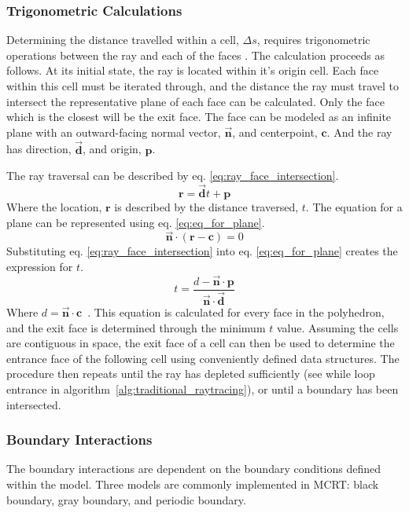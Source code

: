 \subsubsection{Trigonometric Calculations}
Determining the distance travelled within a cell, $\Delta{s}$, requires trigonometric operations between the ray and each of the faces \cite{Zeeb2001AnGeometries}.
The calculation proceeds as follows. At its initial state, the ray is located within it's origin cell. Each face within this cell must be iterated through, and the distance the ray must travel to intersect the representative plane of each face can be calculated. 
Only the face which is the closest will be the exit face. 
The face can be modeled as an infinite plane with an outward-facing normal vector, $\Vec{\textbf{n}}$, and centerpoint, $\textbf{c}$.
And the ray has direction, $\Vec{\textbf{d}}$, and origin, $\textbf{p}$. 


The ray traversal can be described by eq. \ref{eq:ray_face_intersection}.
\begin{equation}
    \textbf{r} = \Vec{\textbf{d}}t + \textbf{p}
    \label{eq:ray_face_intersection}
\end{equation}
Where the location, $\textbf{r}$ is described by the distance traversed, $t$.
The equation for a plane can be represented using eq. \ref{eq:eq_for_plane}.
\begin{equation}
    \Vec{\textbf{n}} \cdot (\textbf{r} - \textbf{c}) = 0
    \label{eq:eq_for_plane}
\end{equation}
Substituting eq. \ref{eq:ray_face_intersection} into eq. \ref{eq:eq_for_plane} creates the expression for $t$.
\begin{equation}
    t=\frac{d-\Vec{\textbf{n}}\cdot\textbf{p}}{\Vec{\textbf{n}}\cdot\Vec{\textbf{d}}}
    \label{eq:eq_for_plane}
\end{equation}
Where $d=\Vec{\textbf{n}}\cdot\textbf{c}$~\cite{Kay1986RayScenes}. This equation is calculated for every face in the polyhedron, and the exit face is determined through the minimum $t$ value. Assuming the cells are contiguous in space, the exit face of a cell can then be used to determine the entrance face of the following cell using conveniently defined data structures.
The procedure then repeats until the ray has depleted sufficiently (see while loop entrance in algorithm~\ref{alg:traditional_raytracing}), or until a boundary has been intersected.

\subsubsection{Boundary Interactions}
The boundary interactions are dependent on the boundary conditions defined within the model. Three models are commonly implemented in MCRT: black boundary, gray boundary, and periodic boundary.

